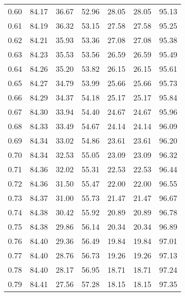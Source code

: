 \begin{tabular}{|c|c|c|c|c|c|c|}
      0.60 &     84.17 &     36.67 &      52.96 &   28.05 &      28.05 &         95.13 \\
      0.61 &     84.19 &     36.32 &      53.15 &   27.58 &      27.58 &         95.25 \\
      0.62 &     84.21 &     35.93 &      53.36 &   27.08 &      27.08 &         95.38 \\
      0.63 &     84.23 &     35.53 &      53.56 &   26.59 &      26.59 &         95.49 \\
      0.64 &     84.26 &     35.20 &      53.82 &   26.15 &      26.15 &         95.61 \\
      0.65 &     84.27 &     34.79 &      53.99 &   25.66 &      25.66 &         95.73 \\
      0.66 &     84.29 &     34.37 &      54.18 &   25.17 &      25.17 &         95.84 \\
      0.67 &     84.30 &     33.94 &      54.40 &   24.67 &      24.67 &         95.96 \\
      0.68 &     84.33 &     33.49 &      54.67 &   24.14 &      24.14 &         96.09 \\
      0.69 &     84.34 &     33.02 &      54.86 &   23.61 &      23.61 &         96.20 \\
      0.70 &     84.34 &     32.53 &      55.05 &   23.09 &      23.09 &         96.32 \\
      0.71 &     84.36 &     32.02 &      55.31 &   22.53 &      22.53 &         96.44 \\
      0.72 &     84.36 &     31.50 &      55.47 &   22.00 &      22.00 &         96.55 \\
      0.73 &     84.37 &     31.00 &      55.73 &   21.47 &      21.47 &         96.67 \\
      0.74 &     84.38 &     30.42 &      55.92 &   20.89 &      20.89 &         96.78 \\
      0.75 &     84.38 &     29.86 &      56.14 &   20.34 &      20.34 &         96.89 \\
      0.76 &     84.40 &     29.36 &      56.49 &   19.84 &      19.84 &         97.01 \\
      0.77 &     84.40 &     28.76 &      56.73 &   19.26 &      19.26 &         97.13 \\
      0.78 &     84.40 &     28.17 &      56.95 &   18.71 &      18.71 &         97.24 \\
      0.79 &     84.41 &     27.56 &      57.28 &   18.15 &      18.15 &         97.35 \\

\end{tabular}
